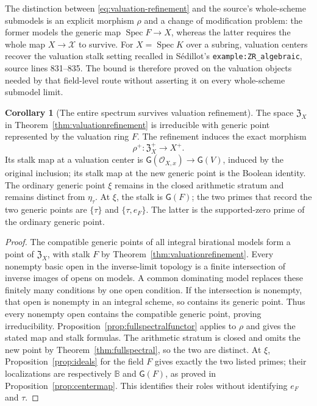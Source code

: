 \documentclass[11pt,a4paper]{article}
\theoremstyle{definition}\newtheorem{definition}[theorem]{Definition}
\newcommand{\Spec}{\operatorname{Spec}}\newcommand{\SpecMon}{\operatorname{Spec}_{\mathrm{mon}}}
\newcommand{\G}{\mathsf G}\newcommand{\Tor}{\operatorname{Tor}}\newcommand{\Frac}{\operatorname{Frac}}
\newtheorem{corollary}[theorem]{Corollary}
\begin{document}
The distinction between \eqref{eq:valuation-refinement} and the source's
whole-scheme submodels is an explicit morphism $\rho$ and a change of
modification problem: the former models the generic map $\Spec F\to X$,
whereas the latter requires the whole map $X\to\mathcal X$ to survive.
For $X=\Spec K$ over a subring, valuation centers recover the valuation
stalk setting recalled in S\'edillot's
\nolinkurl{example:ZR_algebraic}, source lines 831--835. The bound is
therefore proved on the valuation objects needed by that field-level
route without asserting it on every whole-scheme submodel limit.

\begin{corollary}[The entire spectrum survives valuation refinement]
\label{cor:fullrefinement}
The space $\mathfrak Z_X$ in Theorem~\ref{thm:valuationrefinement} is
irreducible with generic point represented by the valuation ring $F$.
The refinement induces the exact morphism
\[
 \rho^+:\mathfrak Z_X^+\longrightarrow X^+.
 \tag{AV7.3a}\label{eq:fullrefinement}
\]
Its stalk map at a valuation center is
$\G(\mathcal O_{X,x})\to\G(V)$, induced by the original inclusion;
its stalk map at the new generic point is the Boolean identity.
The ordinary generic point $\xi$ remains in the closed arithmetic
stratum and remains distinct from $\eta_\tau$. At $\xi$, the stalk is
$\G(F)$; the two primes that record the two generic points are
$\{\tau\}$ and $\{\tau,e_F\}$. The latter is the supported-zero prime
of the ordinary generic point.
\end{corollary}
\begin{proof}
The compatible generic points of all integral birational models form
a point of $\mathfrak Z_X$, with stalk $F$ by
Theorem~\ref{thm:valuationrefinement}. Every nonempty basic open in the
inverse-limit topology is a finite intersection of inverse images of
opens on models. A common dominating model replaces these finitely
many conditions by one open condition. If the intersection is nonempty,
that open is nonempty in an integral scheme, so contains its generic
point. Thus every nonempty open contains the compatible generic point,
proving irreducibility. Proposition~\ref{prop:fullspectralfunctor}
applies to $\rho$ and gives the stated map and stalk formulas.
The arithmetic stratum is closed and omits the new point by
Theorem~\ref{thm:fullspectral}, so the two are distinct. At $\xi$,
Proposition~\ref{prop:ideals} for the field $F$ gives exactly the two
listed primes; their localizations are respectively $\mathbb B$ and
$\G(F)$, as proved in Proposition~\ref{prop:centermap}. This identifies
their roles without identifying $e_F$ and $\tau$.
\end{proof}
\end{document}
